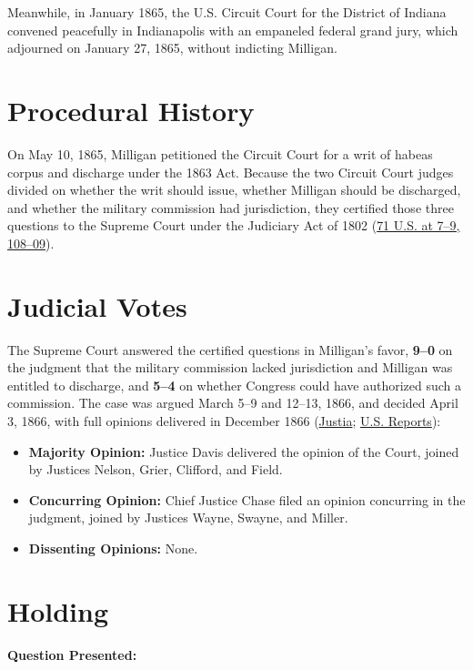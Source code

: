\documentclass[12pt]{article}
\begin{document}
Meanwhile, in January 1865, the U.S. Circuit Court for the District of Indiana convened peacefully in Indianapolis with an empaneled federal grand jury, which adjourned on January 27, 1865, without indicting Milligan.

\section{Procedural History}
On May 10, 1865, Milligan petitioned the Circuit Court for a writ of habeas corpus and discharge under the 1863 Act. Because the two Circuit Court judges divided on whether the writ should issue, whether Milligan should be discharged, and whether the military commission had jurisdiction, they certified those three questions to the Supreme Court under the Judiciary Act of 1802 (\href{https://supreme.justia.com/cases/federal/us/71/2/}{71 U.S. at 7--9, 108--09}).

\section{Judicial Votes}
The Supreme Court answered the certified questions in Milligan's favor, \textbf{9--0} on the judgment that the military commission lacked jurisdiction and Milligan was entitled to discharge, and \textbf{5--4} on whether Congress could have authorized such a commission. The case was argued March 5--9 and 12--13, 1866, and decided April 3, 1866, with full opinions delivered in December 1866 (\href{https://supreme.justia.com/cases/federal/us/71/2/}{Justia}; \href{https://tile.loc.gov/storage-services/service/ll/usrep/usrep071/usrep071002a/usrep071002a.pdf}{U.S. Reports}):

\begin{itemize}
    \item \textbf{Majority Opinion:} Justice Davis delivered the opinion of the Court, joined by Justices Nelson, Grier, Clifford, and Field.
    \item \textbf{Concurring Opinion:} Chief Justice Chase filed an opinion concurring in the judgment, joined by Justices Wayne, Swayne, and Miller.
    \item \textbf{Dissenting Opinions:} None.
\end{itemize}

\section{Holding}
\textbf{Question Presented:}
\end{document}
